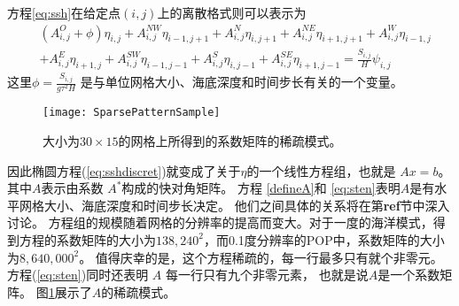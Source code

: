 方程\ref{eq:ssh}在给定点$(i,j)$上的离散格式则可以表示为  
\begin{align}
\label{eq:sten}
&(A_{i,j}^O+\phi ) \eta_{i,j}+A_{i,j}^{NW}\eta_{i-1,j+1}+A_{i,j}^N\eta_{i,j+1} +A_{i,j}^{NE}\eta_{i+1,j+1}+A_{i,j}^W\eta_{i-1,j}  \nonumber\\
& +A_{i,j}^E\eta_{i+1,j} +A_{i,j}^{SW}\eta_{i-1,j-1} +A_{i,j}^S\eta_{i,j-1}+ A_{i,j }^{SE}\eta_{i+1,j-1}= \frac{S_{i,j}}{H}\psi_{i,j}
\end{align}
这里$\phi = \frac{S_{i,j}}{g  \tau^2H}$ 是与单位网格大小、海底深度和时间步长有关的一个变量。

\begin{figure}
\centering
\texttt{[image: SparsePatternSample]}
\caption[] {大小为$30\times 15$的网格上所得到的系数矩阵的稀疏模式。 \label{fig:spy}}
\end{figure}
因此椭圆方程(\ref{eq:sshdiscret})就变成了关于$\eta$的一个线性方程组，也就是 $Ax= b$。 其中$A$表示由系数 $A^*$构成的快对角矩阵。
方程 \ref{defineA}和 \ref{eq:sten}表明$A$是有水平网格大小、海底深度和时间步长决定。 
他们之间具体的关系将在第\textbf{ref}节中深入讨论。
方程组的规模随着网格的分辨率的提高而变大。对于一度的海洋模式，得到方程的系数矩阵的大小为$138,240^2$，而0.1度分辨率的POP中，系数矩阵的大小为$8,640,000^2$。
值得庆幸的是，这个方程稀疏的，每一行最多只有就个非零元。
方程(\ref{eq:sten})同时还表明 $A$ 每一行只有九个非零元素， 也就是说$A$是一个系数矩阵。 图\ref{fig:spy}展示了$A$的稀疏模式。


